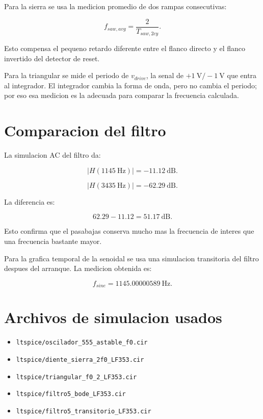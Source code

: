 \documentclass[11pt,letterpaper]{article}
\begin{document}
Para la sierra se usa la medicion promedio de dos rampas consecutivas:

\[
f_{saw,avg}=\frac{2}{T_{saw,2cy}}.
\]

Esto compensa el pequeno retardo diferente entre el flanco directo y el flanco
invertido del detector de reset.

Para la triangular se mide el periodo de \(v_{drive}\), la senal de
\(+1~\text{V}/-1~\text{V}\) que entra al integrador. El integrador cambia la
forma de onda, pero no cambia el periodo; por eso esa medicion es la adecuada
para comparar la frecuencia calculada.

\section{Comparacion del filtro}

La simulacion AC del filtro da:

\[
|H(1145~\text{Hz})|=-11.12~\text{dB}.
\]

\[
|H(3435~\text{Hz})|=-62.29~\text{dB}.
\]

La diferencia es:

\[
62.29-11.12=51.17~\text{dB}.
\]

Esto confirma que el pasabajas conserva mucho mas la frecuencia de interes que
una frecuencia bastante mayor.

Para la grafica temporal de la senoidal se usa una simulacion transitoria del
filtro despues del arranque. La medicion obtenida es:

\[
f_{sine}=1145.00000589~\text{Hz}.
\]

\section{Archivos de simulacion usados}

\begin{itemize}
  \item \texttt{ltspice/oscilador\_555\_astable\_f0.cir}
  \item \texttt{ltspice/diente\_sierra\_2f0\_LF353.cir}
  \item \texttt{ltspice/triangular\_f0\_2\_LF353.cir}
  \item \texttt{ltspice/filtro5\_bode\_LF353.cir}
  \item \texttt{ltspice/filtro5\_transitorio\_LF353.cir}
\end{itemize}
\end{document}
